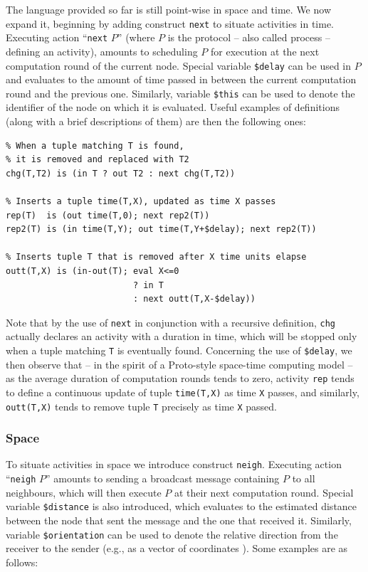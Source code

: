 \documentclass[12pt,a4paper,twoside,openright]{book}
\begin{document}
The language provided so far is still point-wise in space and time.
%
We now expand it, beginning by adding construct \texttt{next} to situate activities in time.
%
Executing action ``\texttt{next} $P$'' (where $P$ is the protocol -- also called process -- defining an activity), amounts to scheduling $P$ for execution at the next computation round of the current node.
%
Special variable \texttt{\$delay} can be used in $P$ and evaluates to the amount of time passed in between the current computation round and the previous one. Similarly, variable \texttt{\$this} can be used to denote the identifier of the node on which it is evaluated.
%
Useful examples of definitions (along with a brief descriptions of them) are then the following ones:
{
\begin{verbatim}
% When a tuple matching T is found,
% it is removed and replaced with T2
chg(T,T2) is (in T ? out T2 : next chg(T,T2))

% Inserts a tuple time(T,X), updated as time X passes
rep(T) 	is (out time(T,0); next rep2(T))
rep2(T) is (in time(T,Y); out time(T,Y+$delay); next rep2(T))

% Inserts tuple T that is removed after X time units elapse
outt(T,X) is (in-out(T); eval X<=0
                         ? in T
                         : next outt(T,X-$delay))
\end{verbatim}
}

\noindent Note that by the use of \texttt{next} in conjunction with a recursive definition, \texttt{chg} actually declares an activity with a duration in time, which will be stopped only when a tuple matching \texttt{T} is eventually found.
%
Concerning the use of \texttt{\$delay}, we then observe that -- in the spirit of a Proto-style space-time computing model -- as the average duration of computation rounds tends to zero, activity \texttt{rep} tends to define a continuous update of tuple \texttt{time(T,X)} as time \texttt{X} passes, and similarly, \texttt{outt(T,X)} tends to remove tuple \texttt{T} precisely as time \texttt{X} passed.

\subsubsection{Space}

To situate activities in space we introduce construct \texttt{neigh}.
%
Executing action ``\texttt{neigh} $P$'' amounts to sending a broadcast message containing $P$ to all neighbours, which will then execute $P$ at their next computation round.
%
Special variable \texttt{\$distance} is also introduced, which evaluates to the estimated distance between the node that sent the message and the one that received it.
%
Similarly, variable \texttt{\$orientation} can be used to denote the relative direction from the receiver to the sender (e.g., as a vector of coordinates \cite{CardelliG10}).
%
Some examples are as follows:
\end{document}
